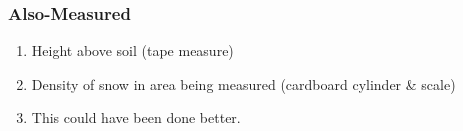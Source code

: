 \documentclass{beamer}
\begin{document}
\begin{frame}
\frametitle{Also-Measured}
\begin{enumerate}
\item Height above soil (tape measure)
\item Density of snow in area being measured (cardboard cylinder \& scale)
\item This could have been done better.
\end{enumerate}
\end{frame}
\end{document}
